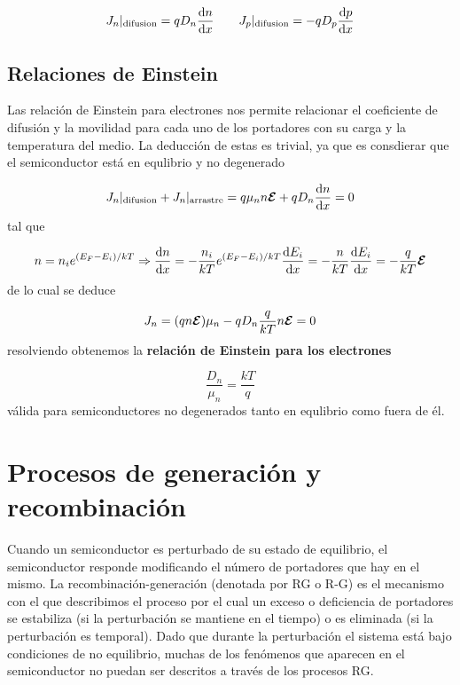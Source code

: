 \begin{equation}
	J_n |_{\text{difusion}} = qD_n \frac{\mathrm{d} n}{\mathrm{d} x} \qquad 	
	J_p |_{\text{difusion}} = -qD_p \frac{\mathrm{d} p}{\mathrm{d} x}
\end{equation}

\subsection{Relaciones de Einstein}

Las relación de Einstein para electrones nos permite relacionar el coeficiente de difusión y la movilidad para cada uno de los portadores con su carga y la temperatura del medio. La deducción de estas es trivial, ya que es consdierar que el semiconductor está en equlibrio y no degenerado

\begin{equation}
	J_n |_{\text{difusion}} +J_n |_{\text{arrastre}} = q\mu_n n \boldsymbol{\mathcal{E}} + qD_n\frac{\mathrm{d} n}{\mathrm{d} x} = 0
\end{equation}
tal que 

\begin{equation}
	n=n_i e^{(E_F-E_i)/kT} \Rightarrow \frac{\mathrm{d} n}{\mathrm{d} x} = - \frac{n_i}{kT} e^{(E_F-E_i)/kT} \frac{\mathrm{d} E_i}{\mathrm{d} x} = - \frac{n}{kT} \frac{\mathrm{d} E_i}{\mathrm{d} x} = - \frac{q}{kT} \boldsymbol{\mathcal{E}}
\end{equation}
de lo cual se deduce 

\begin{equation}
	J_n = (qn\boldsymbol{\mathcal{E}}) \mu_n - qD_n \frac{q}{kT} n \boldsymbol{\mathcal{E}} = 0
\end{equation}
resolviendo obtenemos la \textbf{relación de Einstein para los electrones}

\begin{equation}
	\frac{D_n}{\mu_n} = \frac{kT}{q}
\end{equation}
válida para semiconductores no degenerados tanto en equlibrio como fuera de él.

\section{Procesos de generación y recombinación}

Cuando un semiconductor es perturbado de su estado de equilibrio, el semiconductor responde modificando el número de portadores que hay en el mismo. La recombinación-generación (denotada por RG o R-G) es el mecanismo con el que describimos el proceso por el cual un exceso o deficiencia de portadores se estabiliza (si la perturbación se mantiene en el tiempo) o es eliminada (si la perturbación es temporal). Dado que durante la perturbación el sistema está bajo condiciones de no equilibrio, muchas de los fenómenos que aparecen en el semiconductor no puedan ser descritos a través de los procesos RG. 

